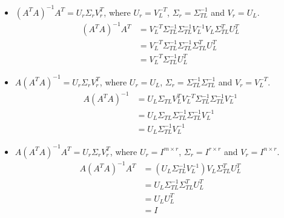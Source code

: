 \documentclass[11pt,a4paper]{article}
\begin{document}
\begin{itemize}
    \item $(A^TA)^{-1} A^T = U_r \Sigma_r V_r^T$, where 
        $U_r = V_L^{-T}$, $\Sigma_r = \Sigma_{TL}^{-1}$ and $V_r = U_L$.
\begin{align}
    (A^TA)^{-1} A^T 
    &= V_L^{-T} \Sigma_{TL}^{-1} \Sigma_{TL}^{-1} V_L^{-1}  V_L \Sigma_{TL}^T U_L^T \\
    &= V_L^{-T} \Sigma_{TL}^{-1} \Sigma_{TL}^{-1} \Sigma_{TL}^T U_L^T \\
    &= V_L^{-T} \Sigma_{TL}^{-1} U_L^T
\end{align}

    \item $A(A^TA)^{-1} = U_r \Sigma_r V_r^T$, where 
        $U_r = U_L$, $\Sigma_r = \Sigma_{TL}^{-1}\Sigma_{TL}^{-1}$ and $V_r = V_L^{-T}$.
\begin{align}
    A (A^TA)^{-1}  
    &= U_L \Sigma_{TL} V_L^T V_L^{-T} \Sigma_{TL}^{-1} \Sigma_{TL}^{-1} V_L^{-1}   \\
    &= U_L \Sigma_{TL} \Sigma_{TL}^{-1} \Sigma_{TL}^{-1} V_L^{-1}   \\
    &= U_L \Sigma_{TL}^{-1} V_L^{-1} 
\end{align}

    \item $A(A^TA)^{-1} A^T = U_r \Sigma_r V_r^T$, where 
        $U_r = I^{m\times r}$, $\Sigma_r = I^{r\times r}$ and $V_r = I^{n\times r}$.
\begin{align}
    A (A^TA)^{-1} A^T
    &= (U_L \Sigma_{TL}^{-1} V_L^{-1}) V_L \Sigma_{TL}^T U_L^T \\
    &= U_L \Sigma_{TL}^{-1} \Sigma_{TL}^T U_L^T \\
    &= U_L  U_L^T \\
    &= I 
\end{align}
\end{itemize}


\newpage
\section{}
\newcommand{\bu}{\mathbf{u}}
\newcommand{\cchi}{\check{\chi}}
\end{document}
